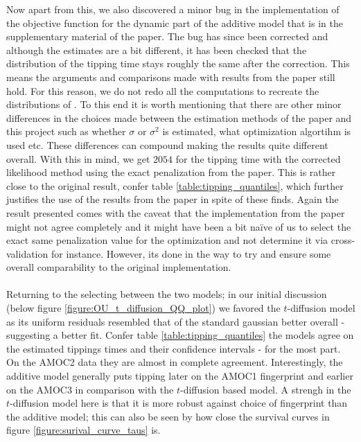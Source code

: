 Now apart from this, we also discovered a minor bug in the implementation of the objective function for the dynamic part of the additive model that is in the supplementary material of the paper. The bug has since been corrected and although the estimates are a bit different, it has been checked that the distribution of the tipping time stays roughly the same after the correction. This means the arguments and comparisons made with results from the paper still hold. For this reason, we do not redo all the computations to recreate the distributions of \cite{Ditlevsen2023}. To this end it is worth mentioning that there are other minor differences in the choices made between the estimation methods of the paper and this project such as whether $\sigma$ or $\sigma^2$ is estimated, what optimization algortihm is used etc. These differences can compound making the results quite different overall. With this in mind, we get $2054$ for the tipping time with the corrected likelihood method using the exact penalization from the paper. This is rather close to the original result, confer table \ref{table:tipping_quantiles}, which further justifies the use of the results from the paper in spite of these finds. Again the result presented comes with the caveat that the implementation from the paper might not agree completely and it might have been a bit naïve of us to select the exact same penalization value for the optimization and not determine it via cross-validation for instance. However, its done in the way to try and ensure some overall comparability to the original implementation.\\\\
Returning to the selecting between the two models; in our initial discussion (below figure \ref{figure:OU_t_diffusion_QQ_plot}) we favored the $t$-diffusion model as its uniform residuals resembled that of the standard gaussian better overall - suggesting a better fit. Confer table \ref{table:tipping_quantiles} the models agree on the estimated tippings times and their confidence intervals - for the most part. On the AMOC2 data they are almost in complete agreement. Interestingly, the additive model generally puts tipping later on the AMOC1 fingerprint and earlier on the AMOC3 in comparison with the $t$-diffusion based model. A strengh in the $t$-diffusion model here is that it is more robust against choice of fingerprint than the additive model; this can also be seen by how close the survival curves in figure \ref{figure:surival_curve_taus} is.

